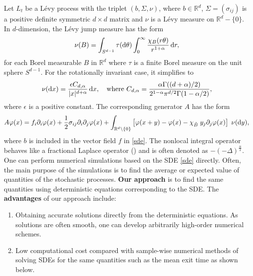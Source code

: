 \documentclass[11pt]{article}
\renewcommand{\phi}{\varphi}
\renewcommand{\a}{\alpha}
\newcommand{\R}{{\mathbb R}}
\begin{document}
Let $L_t$ be a L\'evy process with the   triplet
$(b, \Sigma, \nu)$, where $b \in \mathbb{R}^d$, $\Sigma=(\sigma_{ij})$
is a positive
definite symmetric $d\times d$ matrix and $\nu$ is a L\'evy measure
on $\mathbb{R}^d-\{0\}$.
In $d$-dimension, the L\'evy jump measure has the form
$$
  \nu(B) = \int_{S^{d-1}} \tau({\rm d}\theta) \int_0^\infty
    \frac{\chi_B(r\theta)}{r^{1+\a}} \, {\rm d} r,
$$
for each Borel measurable $B$ in $\R^d$ where $\tau$ is a finite Borel measure
on the unit sphere $S^{d-1}$. For the rotationally invariant case, it
simplifies to
\begin{equation}
  \nu({\rm d}x) = \frac{\epsilon C_{d,\a}}{|x|^{d+\a}}\, {\rm d} x, \quad
   \text{where } C_{d,\a} = \frac{\a\Gamma((d+\a)/2)}{2^{1-\a}\pi^{d/2}
    \Gamma(1-\a/2)},
\label{eq.measure}
\end{equation}
where $\epsilon$ is a positive constant.
The corresponding generator $A$ has the form \cite{Apple}
\begin{equation} \label{A}
A  \phi(x) =  f_i \partial_i \phi(x)
    + \frac{1}{2} \sigma_{ij} \partial_i \partial_j \phi(x)
   + \int_{\R^d \setminus\{0\}} \left[\phi(x+ y)-\phi(x)
      -  \chi_{\hat B} \; y_j\partial_j \phi(x) \right] \; \nu({\rm d}y),
\end{equation}
where $b$ is   included in
the vector field $f$ in \eqref{sde}. The  nonlocal integral operator behaves like a fractional Laplace operator (\cite[Ch. 7]{DuanBook2015}) and is often denoted as $-(-\Delta)^{\frac{\alpha}2  }$.
One can perform numerical simulations based on the SDE \eqref{sde} directly.
Often, the main purpose of the simulations is to find the average
or expected value of quantities of the stochastic processes. {\bf Our approach}
is to find the same quantities using deterministic equations
corresponding to the SDE. The {\bf advantages} of our  approach include:
\begin{enumerate}
\item Obtaining accurate solutions directly from the deterministic equations.
As solutions are often smooth, one can develop arbitrarily high-order
numerical schemes.
\item Low computational cost compared with sample-wise numerical methods
of solving SDEs for the same quantities such as the mean exit time
as shown below.
\end{enumerate}
\end{document}
